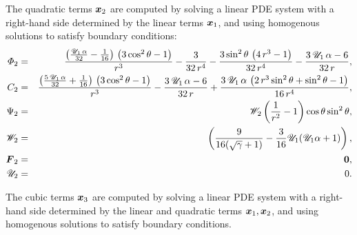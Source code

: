The quadratic terms $\boldsymbol{x}_2$ are computed by solving a linear PDE system 
with a right-hand side determined by the linear terms $\boldsymbol{x}_1$, and using 
homogenous solutions to satisfy boundary conditions:
\begin{eqnarray}
\varPhi_2 &=& \frac{\left(\frac{\mathscr{U}_1\, \alpha}{32} - \frac{1}{16}\right)\, \left(3\, {\cos^2\theta} - 1\right)}{r^3} - \frac{3}{32\, r^4} - \frac{3\, {\sin^2\theta}\, \left(4\, r^3 - 1\right)}{32\, r^4} - \frac{3\, \mathscr{U}_1\, \alpha - 6}{32\, r},
\\
C_2 &=& \frac{\left(\frac{5\, \mathscr{U}_1\, \alpha}{32} + \frac{1}{16}\right)\, \left(3\, {\cos^2\theta} - 1\right)}{r^3} - \frac{3\, \mathscr{U}_1\, \alpha - 6}{32\, r} + \frac{3\, \mathscr{U}_1\, \alpha\, \left(2\, r^3\, {\sin^2\theta} + {\sin^2\theta} - 1\right)}{16\, r^4},
\\
\Psi_2 &=& \mathscr{W}_2
 \left(\frac{1}{r^2} - 1\right) \cos\theta \sin^2\theta,  \\
\mathscr{W}_2 &=& \left(\frac{9}{16(\sqrt{\gamma}+1)} - \frac{3}{16} \mathscr{U}_1 (\mathscr{U}_1 \alpha + 1)\right),\\
\boldsymbol{F}_2 &=& \boldsymbol{0}, \\ \mathscr{U}_2 &=& 0.
\end{eqnarray}

The cubic terms $\boldsymbol{x}_3$ are computed  by solving a linear PDE system 
with a right-hand side determined by the linear and 
quadratic terms $\boldsymbol{x}_1, \boldsymbol{x}_2$, and using 
homogenous solutions to satisfy boundary conditions.

